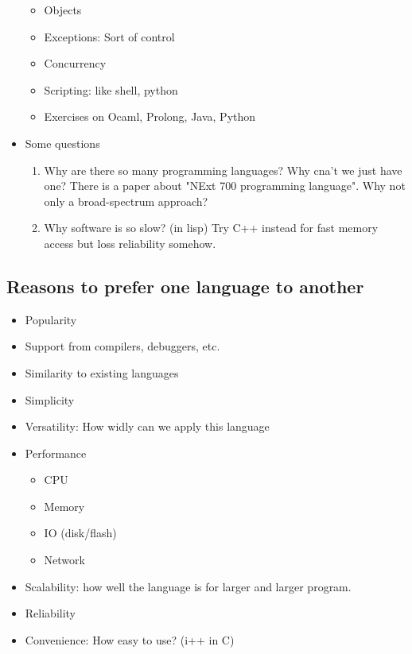\documentclass[11pt]{article}
\begin{document}
\begin{itemize}
\begin{itemize}
\item Objects

\item Exceptions: Sort of control

\item Concurrency

\item Scripting: like shell, python

\item Exercises on Ocaml, Prolong, Java, Python
\end{itemize}

\item Some questions
\begin{enumerate}
\item Why are there so many programming languages?
Why cna't we just have one? There is a paper about "NExt 700 programming
language".
Why not only a broad-spectrum approach?

\item Why software is so slow? (in lisp)
Try C++ instead for fast memory access but loss reliability somehow.
\end{enumerate}
\end{itemize}

\subsection{Reasons to prefer one language to another}
\label{sec:org5d833c0}
\begin{itemize}
\item Popularity
\item Support from compilers, debuggers, etc.
\item Similarity to existing languages
\item Simplicity
\item Versatility: How widly can we apply this language
\item Performance
\begin{itemize}
\item CPU
\item Memory
\item IO (disk/flash)
\item Network
\end{itemize}
\item Scalability: how well the language is for larger and larger program.
\item Reliability
\item Convenience: How easy to use? (i++ in C)
\end{itemize}
\end{document}
